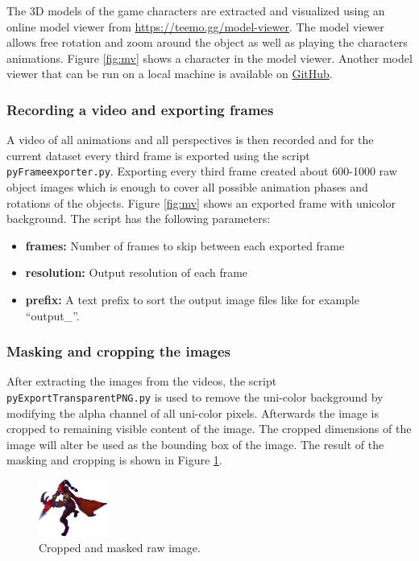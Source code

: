 The 3D models of the game characters are extracted and visualized using an online model viewer from \href{https://teemo.gg/model-viewer}{https://teemo.gg/model-viewer}.
The model viewer allows free rotation and zoom around the object as well as playing the characters animations.
Figure \ref{fig:mv} shows a character in the model viewer.
Another model viewer that can be run on a local machine is available on \href{https://github.com/Querijn/LeagueModel}{GitHub}.
\subsubsection{Recording a video and exporting frames}
A video of all animations and all perspectives is then recorded and for the current dataset every third frame is exported using the script \texttt{pyFrameexporter.py}.
Exporting every third frame created about 600-1000 raw object images which is enough to cover all possible animation phases and rotations of the objects.
Figure \ref{fig:mv} shows an exported frame with unicolor background.
The script has the following parameters:
\begin{itemize}
\item \textbf{frames:} Number of frames to skip between each exported frame
\item \textbf{resolution:} Output resolution of each frame
\item \textbf{prefix:} A text prefix to sort the output image files like for example ``output\_{}''.
\end{itemize}

\subsubsection{Masking and cropping the images}
After extracting the images from the videos, the script \texttt{pyExportTransparentPNG.py} is used to remove the uni-color background by modifying the alpha channel of all uni-color pixels.
Afterwards the image is cropped to remaining visible content of the image.
The cropped dimensions of the image will alter be used as the bounding box of the image.
The result of the masking and cropping is shown in Figure \ref{fig:result}.

\begin{figure}[t]
\centering
\includegraphics[width=0.2\textwidth]{figures/ultrun_32.png}
\caption{Cropped and masked raw image.}
\label{fig:result}
\end{figure}

